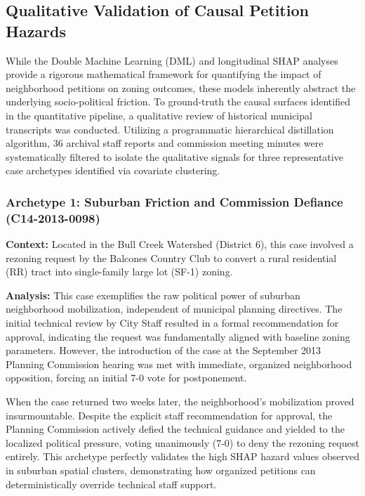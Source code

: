 \subsection{Qualitative Validation of Causal Petition Hazards}
\label{app:qualitative_case_studies}

\noindent While the Double Machine Learning (DML) and longitudinal SHAP analyses provide a rigorous mathematical framework for quantifying the impact of neighborhood petitions on zoning outcomes, these models inherently abstract the underlying socio-political friction. To ground-truth the causal surfaces identified in the quantitative pipeline, a qualitative review of historical municipal transcripts was conducted. Utilizing a programmatic hierarchical distillation algorithm, 36 archival staff reports and commission meeting minutes were systematically filtered to isolate the qualitative signals for three representative case archetypes identified via covariate clustering.

\subsubsection[Archetype 1: Suburban Friction and Commission Defiance]{Archetype 1: Suburban Friction and Commission Defiance (C14-2013-0098)}
\textbf{Context:} Located in the Bull Creek Watershed (District 6), this case involved a rezoning request by the Balcones Country Club to convert a rural residential (RR) tract into single-family large lot (SF-1) zoning. 

\textbf{Analysis:} This case exemplifies the raw political power of suburban neighborhood mobilization, independent of municipal planning directives. The initial technical review by City Staff resulted in a formal recommendation for approval, indicating the request was fundamentally aligned with baseline zoning parameters. However, the introduction of the case at the September 2013 Planning Commission hearing was met with immediate, organized neighborhood opposition, forcing an initial 7-0 vote for postponement. 

When the case returned two weeks later, the neighborhood's mobilization proved insurmountable. Despite the explicit staff recommendation for approval, the Planning Commission actively defied the technical guidance and yielded to the localized political pressure, voting unanimously (7-0) to deny the rezoning request entirely. This archetype perfectly validates the high SHAP hazard values observed in suburban spatial clusters, demonstrating how organized petitions can deterministically override technical staff support.

